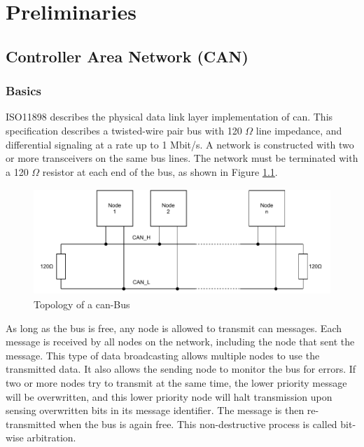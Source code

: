 \chapter{Preliminaries}




\section{Controller Area Network (CAN)}
\subsection{Basics}
ISO11898 describes the physical data link layer implementation of \acrshort{can}. This specification describes a twisted-wire pair bus with 120 $\Omega$ line impedance, and differential signaling at a rate up to 1 Mbit/s. A network is constructed with two or more transceivers on the same bus lines. The network must be terminated with a 120 $\Omega$ resistor at each end of the bus, as shown in Figure \ref{fig:can-bus_topology}.


\begin{figure}[h!]
	\centering
	\includegraphics[height=4cm]{images/can-bus_topology}
	\caption{Topology of a \acrshort{can}-Bus}
	\vspace{-1.4ex}
	\label{fig:can-bus_topology}
\end{figure}

As long as the bus is free, any node is allowed to transmit \acrshort{can} messages. Each message is received by all nodes on the network, including the node that sent the message. This type of data broadcasting allows multiple nodes to use the transmitted data. It also allows the sending node to monitor the bus for errors. If two or more nodes try to transmit at the same time, the lower priority message will be overwritten, and this lower priority node will halt transmission upon sensing overwritten bits in its message identifier. The message is then re-transmitted when the bus is again free. This non-destructive process is called bit-wise arbitration.

